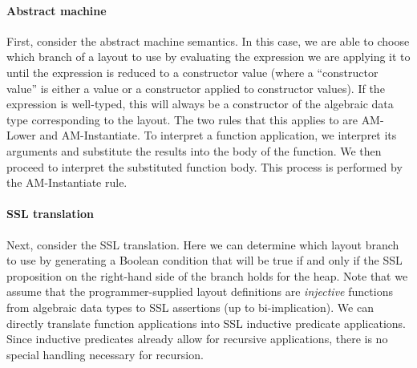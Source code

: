 \paragraph{Abstract machine}
First, consider the abstract machine semantics. In this case, we are able to choose which branch of a layout to use by evaluating the expression we are applying it
          to until the expression is reduced to a constructor value (where a ``constructor value'' is either a value or a constructor applied to constructor values). If the expression is well-typed, this will always be a constructor
          of the algebraic data type corresponding to the layout. The two rules that this applies to are {\sc AM-Lower} and
          {\sc AM-Instantiate}.
        To interpret a function application, we interpret its arguments and substitute the results into the body
          of the function. We then proceed to interpret the substituted function body. This process is performed by the {\sc AM-Instantiate} rule.

\paragraph{SSL translation}
Next, consider the SSL translation. Here we can determine which layout branch to use by generating a Boolean condition that will be
          true if and only if the SSL proposition on the right-hand side of the branch holds for the heap. Note
          that we assume that the programmer-supplied layout definitions are \textit{injective} functions from
          algebraic data types to SSL assertions (up to bi-implication).
We can directly translate function applications into SSL inductive predicate applications. Since inductive predicates
          already allow for recursive applications, there is no special handling necessary for recursion.

%
%
%

